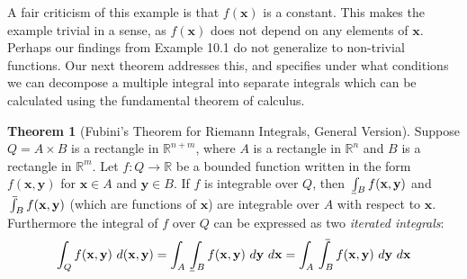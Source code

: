 \documentclass{article}
\def\upint{\mathchoice%
	{\mkern13mu\overline{\vphantom{\intop}\mkern7mu}\mkern-20mu}%
	{\mkern7mu\overline{\vphantom{\intop}\mkern7mu}\mkern-14mu}%
	{\mkern7mu\overline{\vphantom{\intop}\mkern7mu}\mkern-14mu}%
	{\mkern7mu\overline{\vphantom{\intop}\mkern7mu}\mkern-14mu}%
	\int}
\def\lowint{\mkern3mu\underline{\vphantom{\intop}\mkern7mu}\mkern-10mu\int}
\newcommand{\R}{\mathbb{R}}
\newcommand{\x}{\mathbf{x}}
\newcommand{\y}{\mathbf{y}}
\theoremstyle{definition}
\newtheorem{theorem}{Theorem}[section]
\begin{document}
 	A fair criticism of this example is that $ f(\x) $ is a constant. This makes the example trivial in a sense, as $ f(\x) $ does not depend on any elements of $ \x $. Perhaps our findings from Example 10.1 do not generalize to non-trivial functions. Our next theorem addresses this, and specifies under what conditions we can decompose a multiple integral into separate integrals which can be calculated using the fundamental theorem of calculus. 
 	\begin{theorem}[Fubini's Theorem for Riemann Integrals, General Version]
 		Suppose $ Q= A\times B $ is a rectangle in $ \R^{n+m} $, where $ A $ is a rectangle in $ \R^n $ and $ B $ is a rectangle in $ \R^m $. Let $ f:Q\to\R $ be a bounded function written in the form $ f(\x,\y) $ for $ \x\in A $ and $ \y \in B $. If $ f $ is integrable over $ Q $, then $ \lowint_B f(\x,\y) $ and $ \upint_B f(\x,\y) $ (which are functions of $ \x $) are integrable over $ A $ with respect to $ \x $. Furthermore the integral of $ f $ over $ Q $ can be expressed as two \textit{\color{red} iterated integrals}:
 		\begin{align*}
 			\int_Q f(\x,\y)\ d(\x,\y) = \int_{A}\lowint_Bf(\x,\y)\ d\y\ d\x = \int_{A}\upint_Bf(\x,\y)\ d\y\ d\x
 		\end{align*}
 	\end{theorem}
\end{document}
